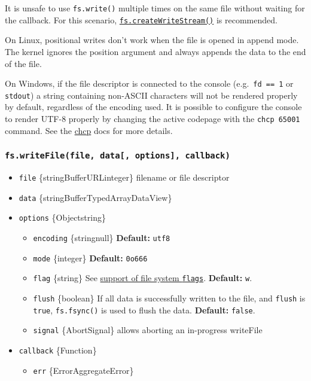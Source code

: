It is unsafe to use \texttt{fs.write()} multiple times on the same file
without waiting for the callback. For this scenario,
\hyperref[fscreatewritestreampath-options]{\texttt{fs.createWriteStream()}}
is recommended.

On Linux, positional writes don't work when the file is opened in append
mode. The kernel ignores the position argument and always appends the
data to the end of the file.

On Windows, if the file descriptor is connected to the console
(e.g.~\texttt{fd\ ==\ 1} or \texttt{stdout}) a string containing
non-ASCII characters will not be rendered properly by default,
regardless of the encoding used. It is possible to configure the console
to render UTF-8 properly by changing the active codepage with the
\texttt{chcp\ 65001} command. See the
\href{https://ss64.com/nt/chcp.html}{chcp} docs for more details.

\subsubsection{\texorpdfstring{\texttt{fs.writeFile(file,\ data{[},\ options{]},\ callback)}}{fs.writeFile(file, data{[}, options{]}, callback)}}\label{fs.writefilefile-data-options-callback}

\begin{itemize}
\tightlist
\item
  \texttt{file} \{string\textbar Buffer\textbar URL\textbar integer\}
  filename or file descriptor
\item
  \texttt{data}
  \{string\textbar Buffer\textbar TypedArray\textbar DataView\}
\item
  \texttt{options} \{Object\textbar string\}

  \begin{itemize}
  \tightlist
  \item
    \texttt{encoding} \{string\textbar null\} \textbf{Default:}
    \texttt{\textquotesingle{}utf8\textquotesingle{}}
  \item
    \texttt{mode} \{integer\} \textbf{Default:} \texttt{0o666}
  \item
    \texttt{flag} \{string\} See \hyperref[file-system-flags]{support of
    file system \texttt{flags}}. \textbf{Default:}
    \texttt{\textquotesingle{}w\textquotesingle{}}.
  \item
    \texttt{flush} \{boolean\} If all data is successfully written to
    the file, and \texttt{flush} is \texttt{true}, \texttt{fs.fsync()}
    is used to flush the data. \textbf{Default:} \texttt{false}.
  \item
    \texttt{signal} \{AbortSignal\} allows aborting an in-progress
    writeFile
  \end{itemize}
\item
  \texttt{callback} \{Function\}

  \begin{itemize}
  \tightlist
  \item
    \texttt{err} \{Error\textbar AggregateError\}
  \end{itemize}
\end{itemize}

